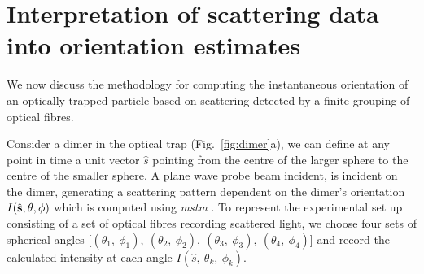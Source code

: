 \section{Interpretation of scattering data into orientation estimates}
We now discuss the methodology for computing the instantaneous 
orientation of an optically trapped particle based on scattering
detected by a finite grouping of optical fibres. 

Consider a dimer in the optical trap (Fig.~\ref{fig:dimer}a), 
we can define at any point in time a unit vector $\hat{s}$ 
pointing from the centre of the larger sphere to the centre 
of the smaller sphere. A plane wave probe beam incident, 
is incident on the dimer, generating a scattering pattern
dependent on the dimer's orientation $I(\hat{\bf s}, 
\theta, \phi)$ which is computed using \textit{mstm} 
\cite{I.Mishchenko1996}. To represent the experimental set 
up consisting of a set of optical fibres recording scattered 
light, we choose four sets of spherical angles [$(\theta_1,\ 
\phi_1), \ (\theta_2,\ \phi_2), \ (\theta_3, \ \phi_3), \ 
(\theta_4,\ \phi_4)$] and record the calculated intensity at 
each angle $I(\hat{s},\ \theta_k,\ \phi_k)$. 
